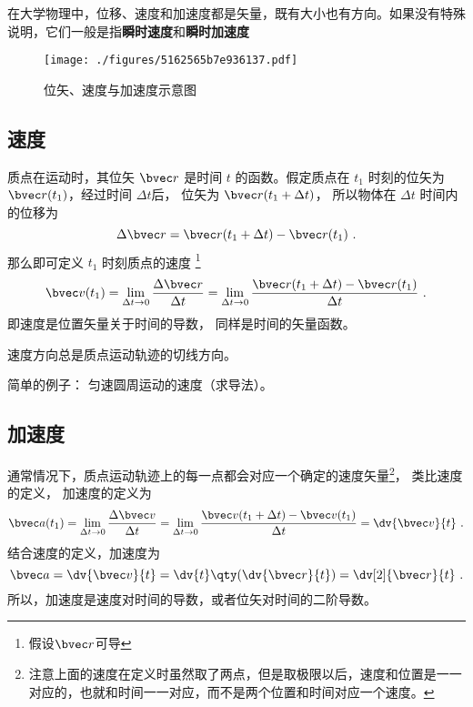 

在大学物理中，位移、速度和加速度都是矢量，既有大小也有方向。如果没有特殊说明，它们一般是指\textbf{瞬时速度}和\textbf{瞬时加速度}

\begin{figure}[ht]
\centering
\texttt{[image: ./figures/5162565b7e936137.pdf]}
\caption{位矢、速度与加速度示意图} \label{fig_VnA_1}
\end{figure}

\subsection{速度}

质点在运动时，其位矢 $\bvec r$ 是时间 $t$ 的函数。假定质点在 $t_1$ 时刻的位矢为 $\bvec r(t_1)$，经过时间 $\Delta t$后， 位矢为 $\bvec r(t_1 + \Delta t)$， 所以物体在 $\Delta t$ 时间内的位移为
\begin{equation}
\Delta \bvec r = \bvec r (t_1 + \Delta t) - \bvec r (t_1)~.
\end{equation}
那么即可定义 $t_1$ 时刻质点的速度
\footnote{假设$\bvec r$可导}
\begin{equation}
\bvec v(t_1) = \lim_{\Delta t \to 0} \frac{\Delta \bvec r}{\Delta t} = \lim_{\Delta t \to 0} \frac{\bvec r (t_1 + \Delta t) - \bvec r(t_1)}{\Delta t}~.
\end{equation}
即速度是位置矢量关于时间的导数， 同样是时间的矢量函数。

\begin{theorem}{}
速度方向总是质点运动轨迹的切线方向。
\end{theorem}

简单的例子： 匀速圆周运动的速度（求导法）。

\subsection{加速度}

通常情况下，质点运动轨迹上的每一点都会对应一个确定的速度矢量\footnote{注意上面的速度在定义时虽然取了两点，但是取极限以后，速度和位置是一一对应的，也就和时间一一对应，而不是两个位置和时间对应一个速度。}， 类比速度的定义， 加速度的定义为
\begin{equation}\label{eq_VnA_4}
\bvec a(t_1) = \lim_{\Delta t \to 0} \frac{\Delta \bvec v}{\Delta t}
= \lim_{\Delta t \to 0} \frac{\bvec v(t_1 + \Delta t) - \bvec v (t_1)}{\Delta t} = \dv{\bvec v}{t}~.
\end{equation}
结合速度的定义，加速度为
\begin{equation}
\bvec a = \dv{\bvec v}{t} = \dv{t} \qty( \dv{\bvec r}{t} ) = \dv[2]{\bvec r}{t}~.
\end{equation}
所以，加速度是速度对时间的导数，或者位矢对时间的二阶导数。

